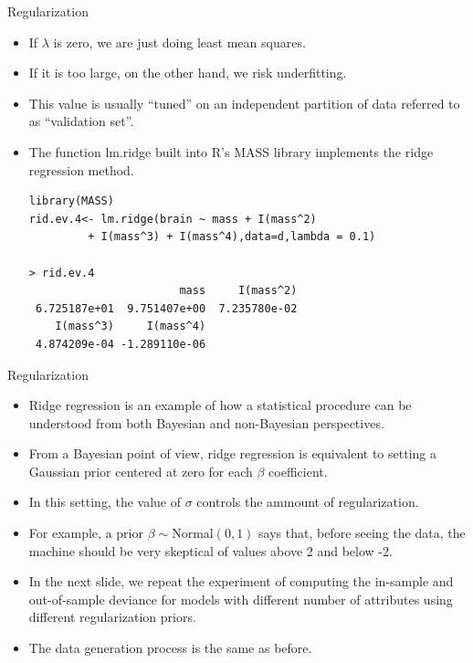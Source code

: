 \documentclass[handout]{beamer}
\begin{document}
\begin{frame}[fragile]{Regularization}
\scriptsize{

\begin{itemize}

\item If $\lambda$ is zero, we are just doing least mean squares.

\item If it is too large, on the other hand, we risk underfitting.

\item This value is usually ``tuned'' on an independent partition of data referred to as ``validation set''. 

\item The function lm.ridge built into R's MASS library implements the ridge regression method. 

\begin{verbatim}
library(MASS)
rid.ev.4<- lm.ridge(brain ~ mass + I(mass^2)
         + I(mass^3) + I(mass^4),data=d,lambda = 0.1) 

> rid.ev.4
                       mass     I(mass^2) 
 6.725187e+01  9.751407e+00  7.235780e-02 
    I(mass^3)     I(mass^4) 
 4.874209e-04 -1.289110e-06         
\end{verbatim}



\end{itemize}


} 
\end{frame}

\begin{frame}{Regularization}
\scriptsize{

\begin{itemize}

\item Ridge regression is an example of how a statistical procedure can be understood from both Bayesian and non-Bayesian perspectives.

\item From a Bayesian point of view, ridge regression is equivalent to setting a Gaussian prior centered at zero for each $\beta$ coefficient.

\item In this setting, the value of $\sigma$ controls the ammount of regularization.

\item For example, a prior $\beta \sim $Normal$(0, 1)$ says that, before seeing the data, the machine should be very skeptical of values above 2 and below -2.

\item In the next slide, we repeat the experiment of computing  the in-sample and out-of-sample deviance for models with different number of attributes using different regularization priors.

\item The data generation process is the same as before.

\end{itemize}


} 
\end{frame}
\end{document}
